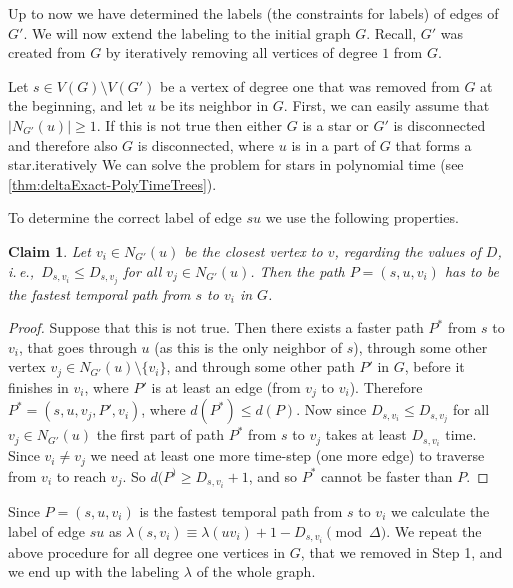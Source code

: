 \documentclass[11pt,a4paper]{article}
\newtheorem{claim}[theorem]{Claim}
\theoremstyle{remark}
\theoremstyle{definition}
\newcommand{\ie}{i.\,e.,\ }
\begin{document}
Up to now we have determined the labels (the constraints for labels) of edges of $G'$. We will now extend the labeling to the initial graph $G$. 
Recall, $G'$ was created from $G$ by iteratively removing all vertices of degree $1$ from $G$.

Let $s \in V(G) \setminus V(G')$ be a vertex of degree one that was removed from $G$ at the beginning,
and let $u$ be its neighbor in $G$.
First, we can easily assume that $|N_{G'}(u)|\geq 1$. If this is not true then either $G$ is a star or $G'$ is disconnected and therefore also $G$ is disconnected, where $u$ is in a part of $G$ that forms a star.iteratively
We can solve the problem for stars in polynomial time (see \cref{thm:deltaExact-PolyTimeTrees}).

To determine the correct label of edge $su$ we use the following properties.
\begin{claim}
Let $v_i \in N_{G'}(u)$ be the closest vertex to $v$, regarding the values of $D$, \ie  $D_{s,v_i} \leq D_{s,v_j}$ for all $v_j \in N_{G'}(u)$.
Then the path $P=(s,u,v_i)$ has to be the fastest temporal path from $s$ to $v_i$ in $G$.
\end{claim}
\begin{proof}
Suppose that this is not true.
Then there exists a faster path $P^*$ from $s$ to $v_i$, that goes through $u$ (as this is the only neighbor of $s$), through some other vertex $v_j \in N_{G'}(u) \setminus \{v_i \}$, 
and through some other path $P'$ in $G$, before it finishes in $v_i$, where $P'$ is at least an edge (from $v_j$ to $v_i$). 
Therefore $P^* = (s,u,v_j,P',v_i)$, where $d(P^*) \leq d(P)$.
Now since $D_{s,v_i} \leq D_{s,v_j}$ for all $v_j \in N_{G'}(u)$ the first part of path $P^*$ from $s$ to $v_j$ takes at least $D_{s,v_i}$ time.
Since $v_i \neq v_j$ we need at least one more time-step (one more edge) to traverse from $v_i$ to reach $v_j$. 
So $d(P^) \geq D_{s,v_i} + 1$, and so $P^*$ cannot be faster than $P$.
\end{proof}

Since $P=(s,u,v_i)$ is the fastest temporal path from $s$ to $v_i$ we calculate the label of edge $su$ as $\lambda (s,v_i) \equiv \lambda(u v_i) + 1 - D_{s,v_i} \pmod \Delta$.
We repeat the above procedure for all degree one vertices in $G$, that we removed in Step 1, and we end up with the labeling $\lambda$ of the whole graph.

\begin{comment}
Now we have to make sure that all the new labels satisfy $D$, to do this we calculate the matrix $D'$ of fastest temporal paths among all pairs of vertices in $(G, \lambda)$ and compare the results with $D$, if any values differ, we stop and return a \textsc{No} answer, if $D = D'$ we return the labeling $\lambda$.

To calculate $\lambda (s,v_i)$ we need $O(|N_{G'}(u)|) = O(n)$ time, therefore to calculate all labels of edges incident to vertices of degree one in $G$, we need $O(n^2)$ time, calculating $D'$ takes $O(n^3\log n)$ time (see \cref{lemma:calculatingD}), therefore the whole step is performed in polynomial time.
\end{comment}
%
%
\end{document}
